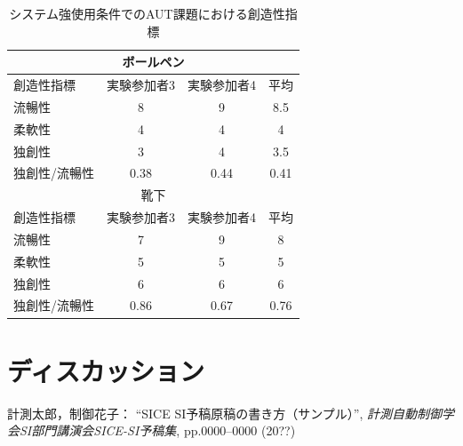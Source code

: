 \documentclass[a4paper]{jarticle}
\begin{document}
\begin{table}[h]
    \caption{システム強使用条件でのAUT課題における創造性指標}
    \label{table:strong}
    \centering
    \begin{tabular}{lccc}
      \hline
      \multicolumn{4}{c}{ボールペン} \\
      \hline
      創造性指標  & 実験参加者3  &  実験参加者4  &  平均 \\
      \hline
      流暢性  & 8  & 9 & 8.5 \\
      柔軟性  & 4   & 4  & 4 \\
      独創性  & 3  & 4 & 3.5 \\
      独創性/流暢性  & 0.38 & 0.44 & 0.41 \\
      \hline
      \multicolumn{4}{c}{靴下} \\
      \hline
      創造性指標  & 実験参加者3  &  実験参加者4  &  平均 \\
      \hline
      流暢性  & 7  & 9 & 8 \\
      柔軟性  & 5   & 5  & 5 \\
      独創性  & 6  & 6 & 6 \\
      独創性/流暢性  & 0.86 & 0.67 & 0.76 \\
      \hline
    \end{tabular}
\end{table}

\section{ディスカッション}
%
%
\begin{thebibliography}{99}
	計測太郎，制御花子：
	``SICE SI予稿原稿の書き方（サンプル）'',  
   {\it 計測自動制御学会SI部門講演会SICE-SI予稿集}, 
    pp.0000--0000 (20??)
\end{thebibliography}
%
%
%
\end{document}
